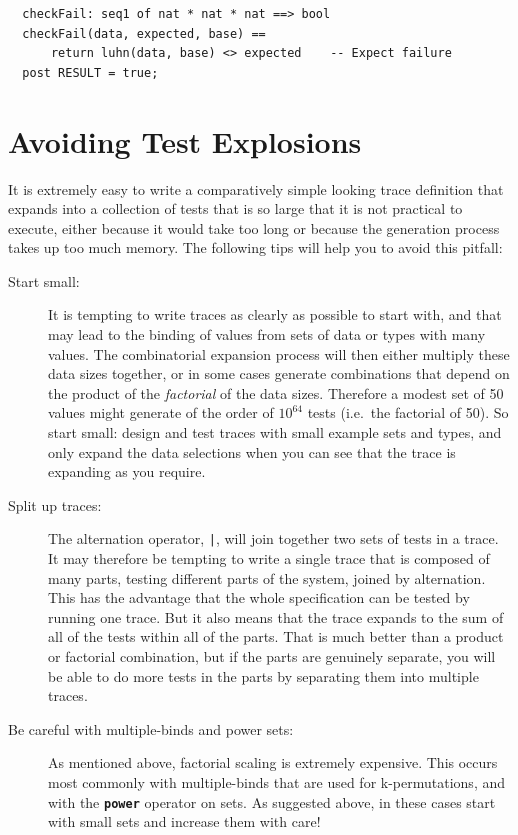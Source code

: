 \documentclass{overturerepchap}
\begin{document}
\scriptsize
\begin{lstlisting}
  checkFail: seq1 of nat * nat * nat ==> bool
  checkFail(data, expected, base) ==
      return luhn(data, base) <> expected    -- Expect failure
  post RESULT = true;
\end{lstlisting}
\normalsize

\section{Avoiding Test Explosions}

It is extremely easy to write a comparatively simple looking trace definition
that expands into a collection of tests that is so large that it is not
practical to execute, either because it would take too long or because the
generation process takes up too much memory. The following tips will help you to
avoid this pitfall:

\begin{description}
  \item[Start small:] It is tempting to write traces as clearly as
  possible to start with, and that may lead to the binding of values from sets
  of data or types with many values. The combinatorial expansion process will
  then either multiply these data sizes together, or in some cases generate 
  combinations that depend on the product of the \emph{factorial} of the data
  sizes. Therefore a modest set of 50 values might generate of the
  order of $10^{64}$ tests (i.e.\ the factorial of 50). So start small: design and test 
  traces with small example sets and types, and only expand the data selections
  when you can see that the trace is expanding as you require.
  \item[Split up traces:] The alternation operator, \texttt{|}, will join
  together two sets of tests in a trace. It may therefore be tempting to write a
  single trace that is composed of many parts, testing different parts of the
  system, joined by alternation. This has the advantage that the whole
  specification can be tested by running one trace. But it also means that the
  trace expands to the sum of all of the tests within all of the parts. That is
  much better than a product or factorial combination, but if the parts are
  genuinely separate, you will be able to do more tests in the parts by
  separating them into multiple traces.
  \item[Be careful with multiple-binds and power sets:] As mentioned
  above, factorial scaling is extremely expensive. This occurs most commonly
  with multiple-binds that are used for k-permutations, and with the
  \texttt{\textbf{power}} operator on sets. As suggested above, in these cases
  start with small sets and increase them with care!
\end{description}
\end{document}

